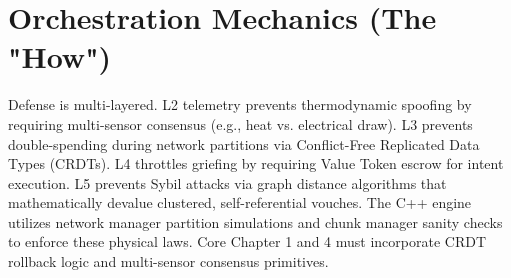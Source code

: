 \section{Orchestration Mechanics (The "How")}
Defense is multi-layered. L2 telemetry prevents thermodynamic spoofing by requiring multi-sensor consensus (e.g., heat vs. electrical draw). L3 prevents double-spending during network partitions via Conflict-Free Replicated Data Types (CRDTs). L4 throttles griefing by requiring Value Token escrow for intent execution. L5 prevents Sybil attacks via graph distance algorithms that mathematically devalue clustered, self-referential vouches. The C++ engine utilizes network manager partition simulations and chunk manager sanity checks to enforce these physical laws. Core Chapter 1 and 4 must incorporate CRDT rollback logic and multi-sensor consensus primitives.
